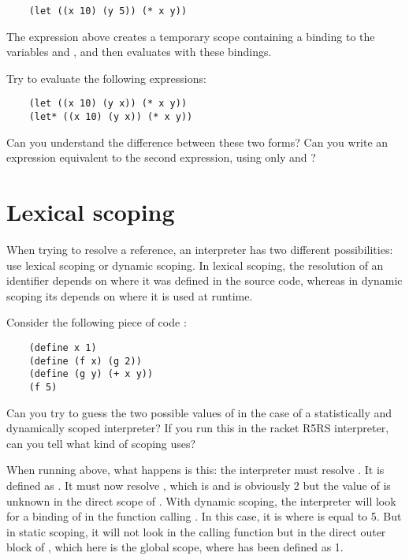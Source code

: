 \documentclass{../../../tp}
\begin{document}
	\begin{verbatim}
	(let ((x 10) (y 5)) (* x y))
	\end{verbatim}

The expression above creates a temporary scope containing a binding to the variables  and , and then evaluates  with these bindings.

\begin{instruction}
	
	Try to evaluate the following expressions:
	
	\begin{verbatim}
	(let ((x 10) (y x)) (* x y))
	(let* ((x 10) (y x)) (* x y))
	\end{verbatim}
	
	Can you understand the difference between these two forms? Can you write an expression equivalent to the second expression, using only  and ?  
	
\end{instruction}


\section{Lexical scoping}

When trying to resolve a reference, an interpreter has two different possibilities: use lexical scoping or dynamic scoping. In lexical scoping, the resolution of an identifier depends on where it was defined in the source code, whereas in dynamic scoping its depends on where it is used at runtime.

\begin{instruction}
	Consider the following piece of code :
	\begin{verbatim}
	(define x 1)
	(define (f x) (g 2))
	(define (g y) (+ x y))
	(f 5)   
	\end{verbatim}
	
	Can you try to guess the two possible values of  in the case of a statistically and dynamically scoped interpreter? If you run this in the racket R5RS interpreter, can you tell what kind of scoping \scheme uses?
	
\end{instruction}

When running  above, what happens is this: the interpreter must resolve . It is defined as . It must now resolve , which is  and  is obviously 2 but the value of  is unknown in the direct scope of . With dynamic scoping, the interpreter will look for a binding of  in the function calling . In this case, it is  where  is equal to 5. But in static scoping, it will not look in the calling function but in the direct outer block of , which here is the global scope, where  has been defined as 1.
\end{document}
